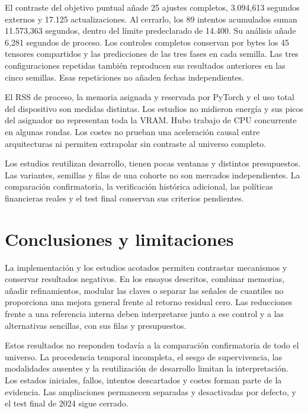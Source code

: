 \documentclass[11pt,a4paper]{report}
\begin{document}
El contraste del objetivo puntual añade 25 ajustes completos,
3.094,613 segundos externos y 17.125 actualizaciones. Al cerrarlo, los
89 intentos acumulados suman 11.573,363 segundos, dentro del límite
predeclarado de 14.400. Su análisis añade 6,281 segundos de proceso.
Los controles completos conservan por bytes los 45 tensores compartidos
y las predicciones de las tres fases en cada semilla. Las tres configuraciones
repetidas también reproducen sus resultados anteriores en las cinco semillas.
Esas repeticiones no añaden fechas independientes.

El RSS de proceso, la memoria asignada y reservada por PyTorch y el uso total
del dispositivo son medidas distintas. Los estudios no midieron energía y
sus picos del asignador no representan toda la VRAM. Hubo trabajo de CPU
concurrente en algunas rondas. Los costes no prueban una aceleración causal
entre arquitecturas ni permiten extrapolar sin contraste al universo
completo.

Los estudios reutilizan desarrollo, tienen pocas ventanas y distintos
presupuestos. Las variantes, semillas y filas de una cohorte no son mercados
independientes. La comparación confirmatoria, la verificación histórica
adicional, las políticas financieras reales y el test final conservan sus
criterios pendientes.

\chapter{Conclusiones y limitaciones}
La implementación y los estudios acotados permiten contrastar mecanismos y
conservar resultados negativos. En los ensayos descritos, combinar memorias,
añadir refinamientos, modular las claves o separar las señales de cuantiles
no proporciona una mejora general
frente al retorno residual cero. Las reducciones frente a una referencia
interna deben interpretarse junto a ese control y a las alternativas
sencillas, con sus filas y presupuestos.

Estos resultados no responden todavía a la comparación confirmatoria de todo
el universo. La procedencia temporal incompleta, el sesgo de supervivencia,
las modalidades ausentes y la reutilización de desarrollo limitan la
interpretación. Los estados iniciales, fallos, intentos descartados y costes
forman parte de la evidencia. Las ampliaciones permanecen separadas y
desactivadas por defecto, y el test final de 2024 sigue cerrado.

\printbibliography
\end{document}
